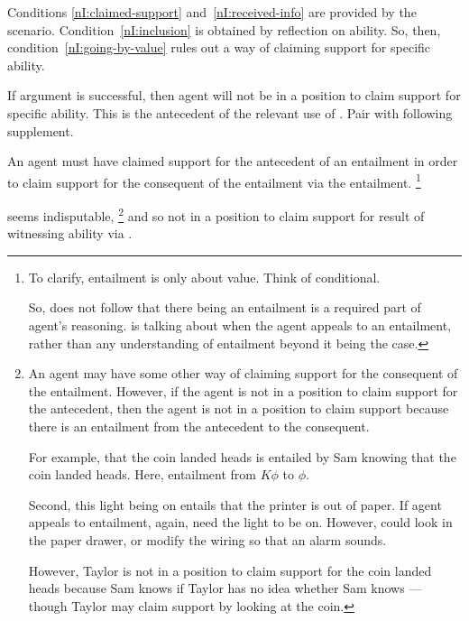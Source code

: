 \newpage

\begin{note}
  Conditions \ref{nI:claimed-support} and~\ref{nI:received-info} are provided by the scenario.
  Condition~\ref{nI:inclusion} is obtained by reflection on ability.
  So, then, condition~\ref{nI:going-by-value} rules out a way of claiming support for specific ability.
\end{note}

\begin{note}
  If argument is successful, then agent will not be in a position to claim support for specific ability.
  This is the antecedent of the relevant use of .
  Pair \nI{} with following supplement.

  \begin{proposition}[\nIm{}]
    An agent must have claimed support for the antecedent of an entailment in order to claim support for the consequent of the entailment via the entailment.\nolinebreak
    \footnote{To clarify, entailment is only about value.
      Think of conditional.

      So, does not follow that there being an entailment is a required part of agent's reasoning.
      \nIm{} is talking about when the agent appeals to an entailment, rather than any understanding of entailment beyond it being the case.
    }
  \end{proposition}
  \nIm{} seems indisputable,\nolinebreak
  \footnote{
    An agent may have some other way of claiming support for the consequent of the entailment.
    However, if the agent is not in a position to claim support for the antecedent, then the agent is not in a position to claim support because there is an entailment from the antecedent to the consequent.\nolinebreak

    For example, that the coin landed heads is entailed by Sam knowing that the coin landed heads.
    Here, entailment from \(K\phi\) to \(\phi\).

    Second, this light being on entails that the printer is out of paper.
    If agent appeals to entailment, again, need the light to be on.
    However, could look in the paper drawer, or modify the wiring so that an alarm sounds.

    However, Taylor is not in a position to claim support for the coin landed heads because Sam knows if Taylor has no idea whether Sam knows --- though Taylor may claim support by looking at the coin.
  }
  and so not in a position to claim support for result of witnessing ability via \AR{}.
\end{note}

